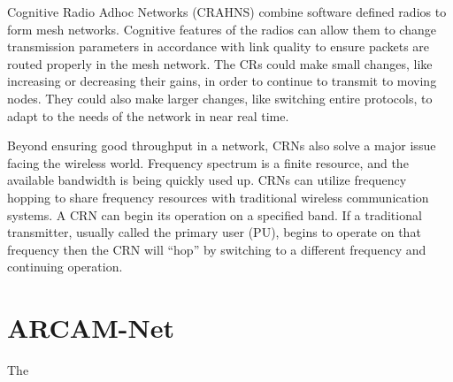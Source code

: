 Cognitive Radio Adhoc Networks (CRAHNS) combine software defined radios to form mesh networks. Cognitive features of the radios can allow them to change transmission parameters in accordance with link quality to ensure packets are routed properly in the mesh network. The CRs could make small changes, like increasing or decreasing their gains, in order to continue to transmit to moving nodes. They could also make larger changes, like switching entire protocols, to adapt to the needs of the network in near real time. 

Beyond ensuring good throughput in a network, CRNs also solve a major issue facing the wireless world. Frequency spectrum is a finite resource, and the available bandwidth is being quickly used up. CRNs can utilize frequency hopping to share frequency resources with traditional wireless communication systems. A CRN can begin its operation on a specified band. If a traditional transmitter, usually called the primary user (PU), begins to operate on that frequency then the CRN will ``hop'' by switching to a different frequency and continuing operation. 


\section{ARCAM-Net}

The 




